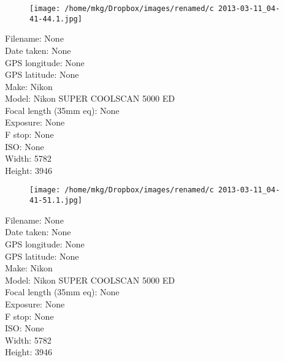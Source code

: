 \clearpage
\recalctypearea
\newpage
\noindent
\begin{figure}
    \texttt{[image: /home/mkg/Dropbox/images/renamed/c 2013-03-11\_04-41-44.1.jpg]}
\end{figure}

\clearpage
\recalctypearea
\newpage
\noindent
Filename: None\\ 
Date taken: None\\ 
GPS longitude: None\\ 
GPS latitude: None\\ 
Make: Nikon\\ 
Model: Nikon SUPER COOLSCAN 5000 ED\\ 
Focal length (35mm eq): None\\ 
Exposure: None\\ 
F stop: None\\ 
ISO: None\\ 
Width: 5782\\ 
Height: 3946\\ 

\clearpage
\recalctypearea
\newpage
\noindent
\begin{figure}
    \texttt{[image: /home/mkg/Dropbox/images/renamed/c 2013-03-11\_04-41-51.1.jpg]}
\end{figure}

\clearpage
\recalctypearea
\newpage
\noindent
Filename: None\\ 
Date taken: None\\ 
GPS longitude: None\\ 
GPS latitude: None\\ 
Make: Nikon\\ 
Model: Nikon SUPER COOLSCAN 5000 ED\\ 
Focal length (35mm eq): None\\ 
Exposure: None\\ 
F stop: None\\ 
ISO: None\\ 
Width: 5782\\ 
Height: 3946\\ 

